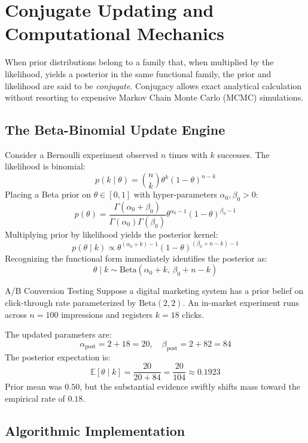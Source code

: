 \section{Conjugate Updating and Computational Mechanics}

When prior distributions belong to a family that, when multiplied by the likelihood, yields a posterior in the same functional family, the prior and likelihood are said to be \emph{conjugate}. Conjugacy allows exact analytical calculation without resorting to expensive Markov Chain Monte Carlo (MCMC) simulations.

\subsection{The Beta-Binomial Update Engine}

Consider a Bernoulli experiment observed \(n\) times with \(k\) successes. The likelihood is binomial:
\[
  p(k \mid \theta) = \binom{n}{k} \theta^k (1 - \theta)^{n - k}
\]
Placing a Beta prior on \(\theta \in [0, 1]\) with hyper-parameters \(\alpha_0, \beta_0 > 0\):
\[
  p(\theta) = \frac{\Gamma(\alpha_0 + \beta_0)}{\Gamma(\alpha_0)\Gamma(\beta_0)} \theta^{\alpha_0 - 1} (1 - \theta)^{\beta_0 - 1}
\]
Multiplying prior by likelihood yields the posterior kernel:
\[
  p(\theta \mid k) \propto \theta^{(\alpha_0 + k) - 1} (1 - \theta)^{(\beta_0 + n - k) - 1}
\]
Recognizing the functional form immediately identifies the posterior as:
\[
  \theta \mid k \sim \text{Beta}(\alpha_0 + k, \, \beta_0 + n - k)
\]

\begin{ExampleBox}{A/B Conversion Testing}
  Suppose a digital marketing system has a prior belief on click-through rate parameterized by \(\text{Beta}(2, 2)\). An in-market experiment runs across \(n = 100\) impressions and registers \(k = 18\) clicks.
  
  The updated parameters are:
  \[
    \alpha_{\text{post}} = 2 + 18 = 20, \quad \beta_{\text{post}} = 2 + 82 = 84
  \]
  The posterior expectation is:
  \[
    \mathbb{E}[\theta \mid k] = \frac{20}{20 + 84} = \frac{20}{104} \approx 0.1923
  \]
  Prior mean was \(0.50\), but the substantial evidence swiftly shifts mass toward the empirical rate of \(0.18\).
\end{ExampleBox}

\subsection{Algorithmic Implementation}


